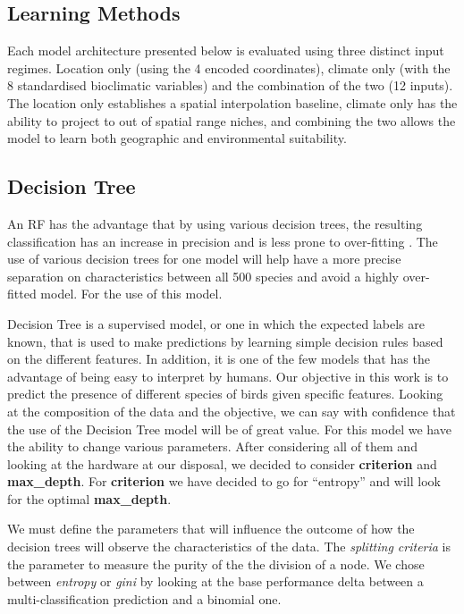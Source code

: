 \documentclass{article}
\begin{document}
\subsection{Learning Methods}\label{lit_rev_lm}

Each model architecture presented below is evaluated using three distinct input regimes. Location only (using the 4 encoded coordinates), climate only (with the 8 standardised bioclimatic variables) and the combination of the two (12 inputs). The location only establishes a spatial interpolation baseline, climate only has the ability to project to out of spatial range niches, and combining the two allows the model to learn both geographic and environmental suitability.

\subsection{Decision Tree}\label{lit_rev_dt}\textbf{}

An RF has the advantage that by using various decision trees, the resulting classification has an increase in precision and is less prone to over-fitting \cite{JMLR:v12:pedregosa11a}. The use of various decision trees for one model will help have a more precise separation on characteristics between all 500 species and avoid a highly over-fitted model. For the use of this model.

Decision Tree is a supervised model, or one in which the expected labels are known, that is used to make predictions by learning simple decision rules based on the different features\cite{JMLR:v12:pedregosa11a}. In addition, it is one of the few models that has the advantage of being easy to interpret by humans. Our objective in this work is to predict the presence of different species of birds given specific features. Looking at the composition of the data and the objective, we can say with confidence that the use of the Decision Tree model will be of great value. For this model we have the ability to change various parameters. After considering all of them and looking at the hardware at our disposal, we decided to consider \textbf{criterion} and \textbf{max\_depth}. For \textbf{criterion} we have decided to go for ``entropy'' and will look for the optimal \textbf{max\_depth}.

We must define the parameters that will influence the outcome of how the decision trees will observe the characteristics of the data. The \textit{splitting criteria} is the parameter to measure the purity of the the division of a node. We chose between \textit{entropy} or \textit{gini} by looking at the base performance delta between a multi-classification prediction and a binomial one.
\end{document}
